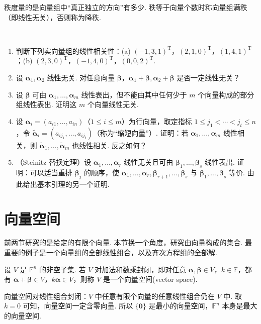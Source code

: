\documentclass[lang=cn,10.5pt,scheme=chinese,toc=twocol,section,chinesefont=nofont,
twoside,citestyle=gb7714-2015,bibstyle=gb7714-2015]{elegantbook}
\DeclareRobustCommand{\textbf}[1]{{\lnsemiboldlatin\lnsemiboldcjk #1}}
\newcommand{\vv}[1]{\boldsymbol{#1}}
\newcommand{\zero}{\boldsymbol{0}}          %
\newcommand{\trans}{\mathrm{T}}             %
\numberwithin{equation}{section}   %
\newcommand*{\lnlabel}[1]{{\sffamily\bfseries\color{black}#1}}
\renewenvironment{exercise}[1][]{%
	\refstepcounter{exer}%
	\par\noindent\makebox[-3pt][r]{\scriptsize\color{black}\HandPencilLeft\quad}%
	\lnlabel{\exercisename\ \theexer\ifblank{#1}{}{\ #1}}\ \rmfamily}{%
	\par\ignorespacesafterend}
\begin{document}
秩度量的是向量组中“真正独立的方向”有多少. 秩等于向量个数时称向量组\textbf{满秩}（即线性无关），否则称为\textbf{降秩}.

\begin{exercise}
  \begin{enumerate}
    \item 判断下列实向量组的线性相关性：(a) $(-1,3,1)^\trans$，$(2,1,0)^\trans$，$(1,4,1)^\trans$；(b) $(2,3,0)^\trans$，$(-1,4,0)^\trans$，$(0,0,2)^\trans$.
    \item 设 $\vv{\alpha}_1,\vv{\alpha}_2$ 线性无关. 对任意向量 $\vv\beta$，$\vv{\alpha}_1+\vv{\beta},\vv{\alpha}_2+\vv{\beta}$ 是否一定线性无关？
    \item 设 $\vv{\beta}$ 可由 $\vv{\alpha}_1,\ldots,\vv{\alpha}_m$ 线性表出，但不能由其中任何少于 $m$ 个向量构成的部分组线性表出. 证明这 $m$ 个向量线性无关.
    \item 设 $\vv{\alpha}_i = (a_{i1}, \ldots, a_{in})$（$1 \le i \le m$）为行向量，取定指标 $1 \le j_1 < \cdots < j_t \le n$，令 $\tilde{\vv{\alpha}}_i = (a_{ij_1}, \ldots, a_{ij_t})$（称为“缩短向量”）. 证明：若 $\vv\alpha_1,\ldots,\vv\alpha_m$ 线性相关，则 $\tilde{\vv\alpha}_1,\ldots,\tilde{\vv\alpha}_m$ 也线性相关. 反之如何？
    \item （Steinitz 替换定理）设 $\vv\alpha_1,\ldots,\vv\alpha_r$ 线性无关且可由 $\vv\beta_1,\ldots,\vv\beta_s$ 线性表出. 证明：可以适当重排 $\vv\beta_j$ 的顺序，使 $\vv\alpha_1,\ldots,\vv\alpha_r,\vv\beta_{r+1},\ldots,\vv\beta_s$ 与 $\vv\beta_1,\ldots,\vv\beta_s$ 等价. 由此给出基本引理的另一个证明.
  \end{enumerate}
\end{exercise}

\section{向量空间}\label{sec:vecspace}

前两节研究的是给定的有限个向量. 本节换一个角度，研究由向量构成的集合. 最重要的例子是一个向量组的全部线性组合，以及齐次方程组的全部解.

\begin{definition}
  \label{def:vecspace}
  设 $V$ 是 $\mathbb{F}^n$ 的非空子集. 若 $V$ 对加法和数乘封闭，即对任意 $\vv\alpha,\vv\beta\in V$，$k\in\mathbb{F}$，都有 $\vv\alpha+\vv\beta\in V$，$k\vv\alpha\in V$，则称 $V$ 是一个\textbf{向量空间}(vector space).
\end{definition}

向量空间对线性组合封闭：$V$ 中任意有限个向量的任意线性组合仍在 $V$ 中. 取 $k=0$ 可知，向量空间一定含零向量. 所以 $\{\zero\}$ 是最小的向量空间，$\mathbb{F}^n$ 本身是最大的向量空间.
\end{document}
